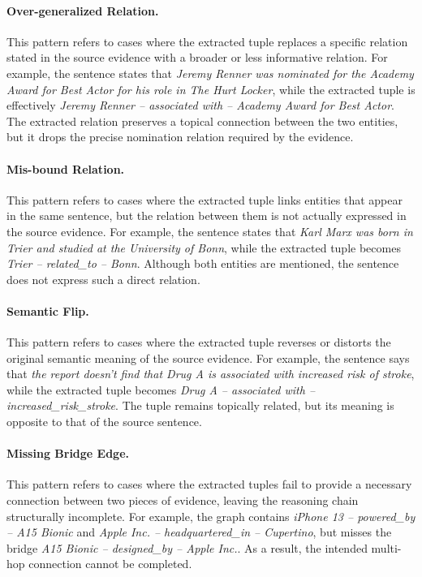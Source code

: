 \documentclass{article}
\theoremstyle{plain}
\theoremstyle{definition}
\theoremstyle{remark}
\begin{document}
\paragraph{Over-generalized Relation.}
This pattern refers to cases where the extracted tuple replaces a specific relation stated in the source evidence with a broader or less informative relation.
For example, the sentence states that \emph{Jeremy Renner was nominated for the Academy Award for Best Actor for his role in The Hurt Locker}, while the extracted tuple is effectively \emph{Jeremy Renner -- associated with -- Academy Award for Best Actor}. The extracted relation preserves a topical connection between the two entities, but it drops the precise nomination relation required by the evidence.

\paragraph{Mis-bound Relation.}
This pattern refers to cases where the extracted tuple links entities that appear in the same sentence, but the relation between them is not actually expressed in the source evidence.
For example, the sentence states that \emph{Karl Marx was born in Trier and studied at the University of Bonn}, while the extracted tuple becomes \emph{Trier -- related\_to -- Bonn}. Although both entities are mentioned, the sentence does not express such a direct relation.

\paragraph{Semantic Flip.}
This pattern refers to cases where the extracted tuple reverses or distorts the original semantic meaning of the source evidence.
For example, the sentence says that \emph{the report doesn't find that Drug A is associated with increased risk of stroke}, while the extracted tuple becomes \emph{Drug A -- associated with -- increased\_risk\_stroke}. The tuple remains topically related, but its meaning is opposite to that of the source sentence.

\paragraph{Missing Bridge Edge.}
This pattern refers to cases where the extracted tuples fail to provide a necessary connection between two pieces of evidence, leaving the reasoning chain structurally incomplete.
For example, the graph contains \emph{iPhone 13 -- powered\_by -- A15 Bionic} and \emph{Apple Inc. -- headquartered\_in -- Cupertino}, but misses the bridge \emph{A15 Bionic -- designed\_by -- Apple Inc.}. As a result, the intended multi-hop connection cannot be completed.
\end{document}
